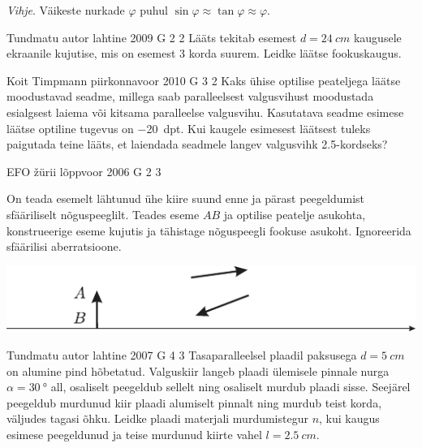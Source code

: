 \documentclass[11pt, twoside]{article}
\begin{document}
{{\emph{Vihje}. Väikeste nurkade $\varphi$ puhul $\sin \varphi \approx \tan \varphi \approx \varphi$.
\fi
}

{Tundmatu autor} %
{lahtine} %
{2009} %
{G 2} %
{2} %
{
\ifStatement
Lääts tekitab esemest $d = \SI{24}{cm}$ kaugusele ekraanile kujutise, mis on esemest \num{3} korda suurem. Leidke läätse fookuskaugus.
\fi
}

{Koit Timpmann} %
{piirkonnavoor} %
{2010} %
{G 3} %
{2} %
{
\ifStatement
Kaks ühise optilise peateljega läätse moodustavad seadme, millega saab paralleelsest valgusvihust moodustada esialgsest laiema või kitsama paralleelse valgusvihu. Kasutatava seadme esimese läätse optiline tugevus on \SI{-20}{dpt}. Kui kaugele esimesest läätsest tuleks paigutada teine lääts, et laiendada seadmele langev valgusvihk \num{2.5}-kordseks?
\fi
}

{EFO žürii} %
{lõppvoor} %
{2006} %
{G 2} %
{3} %
{
\ifStatement
On teada esemelt lähtunud ühe kiire suund enne ja pärast peegeldumist sfääriliselt nõguspeeglilt. Teades eseme $AB$ ja optilise peatelje asukohta, konstrueerige eseme kujutis ja tähistage nõguspeegli fookuse asukoht. Ignoreerida sfäärilisi aberratsioone.

\begin{center}
	\includegraphics[width=0.9\linewidth]{2006-v3g-02-yl}
\end{center}
\fi
}

{Tundmatu autor} %
{lahtine} %
{2007} %
{G 4} %
{3} %
{
\ifStatement
Tasaparalleelsel plaadil paksusega $d = \SI{5}{cm}$ on alumine pind hõbetatud. Valguskiir langeb plaadi ülemisele pinnale nurga $\alpha = \SI{30}{\degree}$ all, osaliselt peegeldub sellelt ning osaliselt murdub plaadi sisse. Seejärel peegeldub murdunud kiir plaadi alumiselt pinnalt ning murdub teist korda, väljudes tagasi õhku. Leidke plaadi materjali murdumistegur $n$, kui kaugus esimese peegeldunud ja teise murdunud kiirte vahel $l = \SI{2,5}{cm}$.
\fi
}

}
\end{document}

